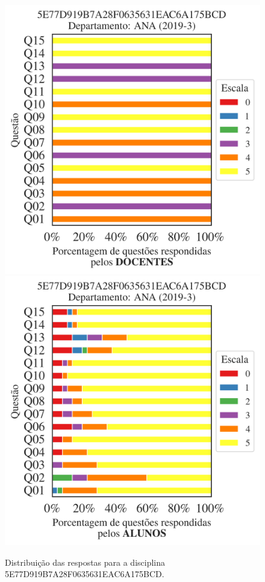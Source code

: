 \documentclass[a4paper,10pt]{article}
\begin{document}
\begin{figure}[h]
\centering
\includegraphics[width=0.485\linewidth]{analise_disciplina_departamento_ANA_5E77D919B7A28F0635631EAC6A175BCD_docentes.png}
\includegraphics[width=0.485\linewidth]{analise_disciplina_departamento_ANA_5E77D919B7A28F0635631EAC6A175BCD_alunos.png}
\caption{\label{fig:analise_geral_departamento}                Distribuição das respostas para a disciplina 5E77D919B7A28F0635631EAC6A175BCD. }
\end{figure}
\end{document}
